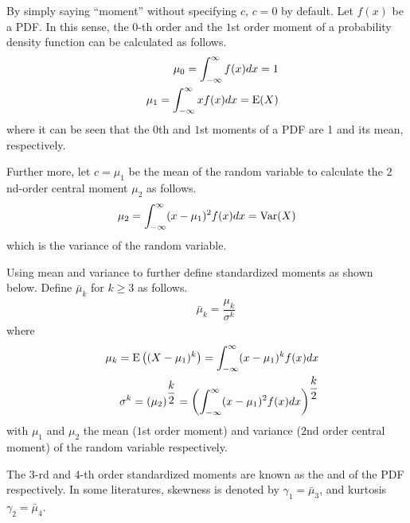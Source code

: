 By simply saying ``moment'' without specifying $c$, $c=0$ by default. Let $f(x)$ be a PDF. In this sense, the $0$-th order and the $1$st order moment of a probability density function can be calculated as follows.
\begin{eqnarray}
	&& \mu_0 = \int_{-\infty}^{\infty}f(x)dx = 1 \nonumber \\
	&& \mu_1 = \int_{-\infty}^{\infty}xf(x)dx = \textup{E}(X) \nonumber
\end{eqnarray}
where it can be seen that the $0$th and $1$st moments of a PDF are 1 and its mean, respectively.

Further more, let $c=\mu_1$ be the mean of the random variable to calculate the $2$nd-order central moment $\mu_2$ as follows.
\begin{eqnarray}
	\mu_2 = \int_{-\infty}^{\infty}(x-\mu_1)^2f(x)dx = \textup{Var}(X) \nonumber
\end{eqnarray}
which is the variance of the random variable.

Using mean and variance to further define standardized moments as shown below. Define $\bar{\mu}_k$ for $k\geq 3$ as follows.
\begin{eqnarray}
	&& \bar{\mu}_k = \dfrac{\mu_k}{\sigma^k} \nonumber
\end{eqnarray}
where
\begin{eqnarray}
	&& \mu_k = \textup{E}\left((X-\mu_1)^k\right) = \int_{-\infty}^{\infty}(x-\mu_1)^kf(x)dx \nonumber \\
	&& \sigma^k = \left(\mu_2\right)^{\dfrac{k}{2}} = \left(\int_{-\infty}^{\infty}(x-\mu_1)^2f(x)dx\right)^{\dfrac{k}{2}} \nonumber
\end{eqnarray}
with $\mu_1$ and $\mu_2$ the mean ($1$st order moment) and variance ($2$nd order central moment) of the random variable respectively.

The $3$-rd and $4$-th order standardized moments are known as the  and  of the PDF respectively. In some literatures, skewness is denoted by $\gamma_1 = \bar{\mu}_3$, and kurtosis $\gamma_2 = \bar{\mu}_4$.

